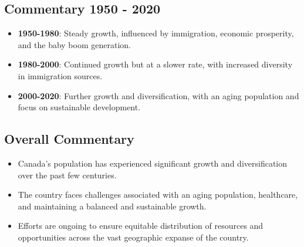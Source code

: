\subsection*{Commentary 1950 - 2020}
\begin{itemize}
    \item \textbf{1950-1980}: Steady growth, influenced by immigration, economic prosperity, and the baby boom generation.
    \item \textbf{1980-2000}: Continued growth but at a slower rate, with increased diversity in immigration sources.
    \item \textbf{2000-2020}: Further growth and diversification, with an aging population and focus on sustainable development.
\end{itemize}

\subsection*{Overall Commentary}
\begin{itemize}
    \item Canada’s population has experienced significant growth and diversification over the past few centuries.
    \item The country faces challenges associated with an aging population, healthcare, and maintaining a balanced and sustainable growth.
    \item Efforts are ongoing to ensure equitable distribution of resources and opportunities across the vast geographic expanse of the country.
\end{itemize}